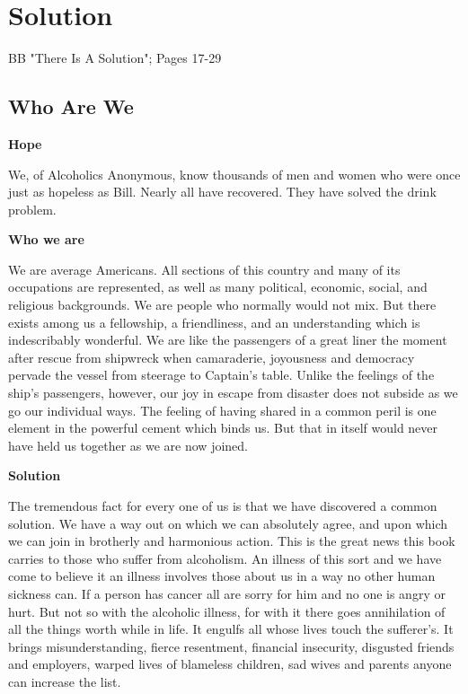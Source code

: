 
\chapter{Solution}

BB "There Is A Solution"; Pages 17-29

\section{Who Are We}

\textbf{Hope}

We, of Alcoholics Anonymous, know thousands of men and women who were once just as hopeless as Bill. 
Nearly all have recovered. 
They have solved the drink problem.

\textbf{Who we are}

We are average Americans. 
All sections of this country and many of its occupations are represented, as well as many political, economic, social, and religious backgrounds. 
We are people who normally would not mix. 
But there exists among us a fellowship, a friendliness, and an understanding which is indescribably wonderful. 
We are like the passengers of a great liner the moment after rescue from shipwreck when camaraderie, joyousness and democracy pervade the vessel from steerage to Captain's table. 
Unlike the feelings of the ship's passengers, however, our joy in escape from disaster does not subside as we go our individual ways. 
The feeling of having shared in a common peril is one element in the powerful cement which binds us. 
But that in itself would never have held us together as we are now joined.

\textbf{Solution}

The tremendous fact for every one of us is that we have discovered a common solution. 
We have a way out on which we can absolutely agree, 
and upon which we can join in brotherly and harmonious action. 
This is the great news this book carries to those who suffer from alcoholism. 
An illness of this sort and we have come to believe it an illness involves those about us in a way no other human sickness can. 
If a person has cancer all are sorry for him and no one is angry or hurt. 
But not so with the alcoholic illness, for with it there goes annihilation of all the things worth while in life. 
It engulfs all whose lives touch the sufferer's. 
It brings misunderstanding, fierce resentment, financial insecurity, disgusted friends and employers, 
warped lives of blameless children, sad wives and parents anyone can increase the list.

